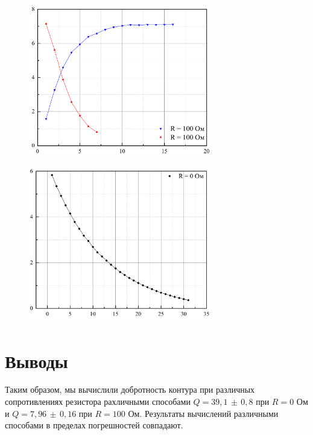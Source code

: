 \documentclass[a4paper,12pt]{article} %
\begin{document}
\begin{figure}[h!]
	\begin{floatrow}
		{\includegraphics[width=8cm,height=7cm]{Graph_1}}
		{\includegraphics[width=8cm,height=7cm]{Graph_2}}         
	\end{floatrow}
\end{figure}


\section{Выводы}
	Таким образом, мы вычислили добротность контура при различных сопротивлениях резистора рахличными способами $Q = 39,1 \, \pm \, 0,8$ при $R = 0$ Ом и $Q = 7,96 \, \pm \, 0,16$ при $R = 100$ Ом. Результаты вычислений различными способами в пределах погрешностей совпадают.
	
	
\end{document}
